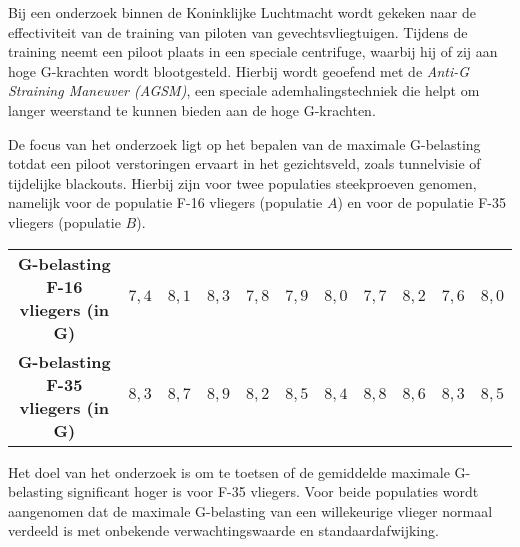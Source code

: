 \begin{question}{28}{
    Bij een onderzoek binnen de Koninklijke Luchtmacht wordt gekeken naar de effectiviteit van de training van piloten van gevechtsvliegtuigen.
    Tijdens de training neemt een piloot plaats in een speciale centrifuge, waarbij hij of zij aan hoge G-krachten wordt blootgesteld.
    Hierbij wordt geoefend met de \emph{Anti-G Straining Maneuver (AGSM)}, een speciale ademhalingstechniek die helpt om langer weerstand te kunnen bieden aan de hoge G-krachten.

    De focus van het onderzoek ligt op het bepalen van de maximale G-belasting totdat een piloot verstoringen ervaart in het gezichtsveld, zoals tunnelvisie of tijdelijke blackouts.
    Hierbij zijn voor twee populaties steekproeven genomen, namelijk voor de populatie F-16 vliegers (populatie $A$) en voor de populatie F-35 vliegers (populatie $B$).

    \begin{center}
            \begin{tabular}{c|cccccccccc}
                \toprule
                    \textbf{G-belasting F-16 vliegers (in G)} & $7,4$ & $8,1$ & $8,3$ & $7,8$ & $7,9$ & $8,0$ & $7,7$ & $8,2$ & $7,6$ & $8,0$ \\
                    \textbf{G-belasting F-35 vliegers (in G)} & $8,3$ & $8,7$ & $8,9$ & $8,2$ & $8,5$ & $8,4$ & $8,8$ & $8,6$ & $8,3$ & $8,5$ \\
                \bottomrule
            \end{tabular}
        \end{center}

    Het doel van het onderzoek is om te toetsen of de gemiddelde maximale G-belasting significant hoger is voor F-35 vliegers. 
    Voor beide populaties wordt aangenomen dat de maximale G-belasting van een willekeurige vlieger normaal verdeeld is met onbekende verwachtingswaarde en standaardafwijking.
}
\end{question}
